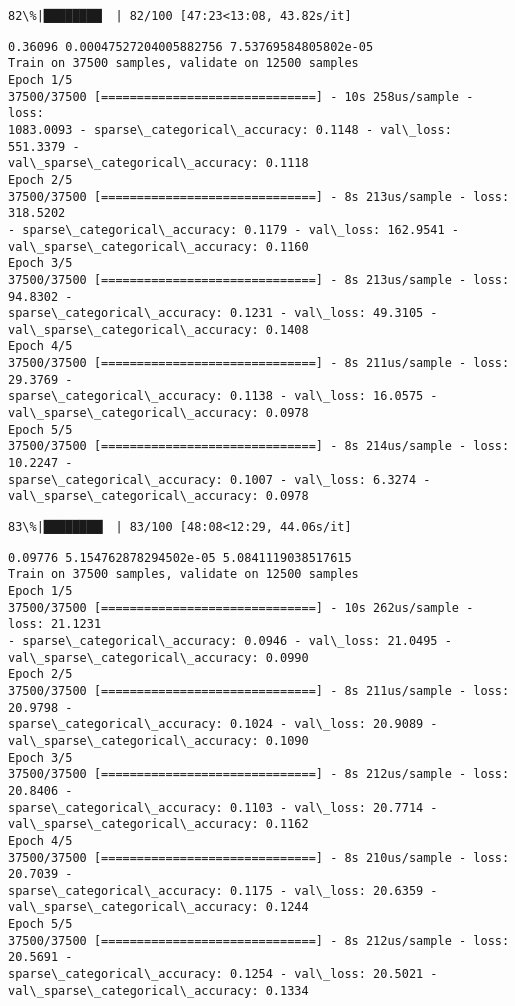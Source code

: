 \documentclass[11pt]{article}
\begin{document}
    \begin{Verbatim}[commandchars=\\\{\}]
 82\%|████████▏ | 82/100 [47:23<13:08, 43.82s/it]
    \end{Verbatim}

    \begin{Verbatim}[commandchars=\\\{\}]
0.36096 0.00047527204005882756 7.53769584805802e-05
Train on 37500 samples, validate on 12500 samples
Epoch 1/5
37500/37500 [==============================] - 10s 258us/sample - loss:
1083.0093 - sparse\_categorical\_accuracy: 0.1148 - val\_loss: 551.3379 -
val\_sparse\_categorical\_accuracy: 0.1118
Epoch 2/5
37500/37500 [==============================] - 8s 213us/sample - loss: 318.5202
- sparse\_categorical\_accuracy: 0.1179 - val\_loss: 162.9541 -
val\_sparse\_categorical\_accuracy: 0.1160
Epoch 3/5
37500/37500 [==============================] - 8s 213us/sample - loss: 94.8302 -
sparse\_categorical\_accuracy: 0.1231 - val\_loss: 49.3105 -
val\_sparse\_categorical\_accuracy: 0.1408
Epoch 4/5
37500/37500 [==============================] - 8s 211us/sample - loss: 29.3769 -
sparse\_categorical\_accuracy: 0.1138 - val\_loss: 16.0575 -
val\_sparse\_categorical\_accuracy: 0.0978
Epoch 5/5
37500/37500 [==============================] - 8s 214us/sample - loss: 10.2247 -
sparse\_categorical\_accuracy: 0.1007 - val\_loss: 6.3274 -
val\_sparse\_categorical\_accuracy: 0.0978
    \end{Verbatim}

    \begin{Verbatim}[commandchars=\\\{\}]
 83\%|████████▎ | 83/100 [48:08<12:29, 44.06s/it]
    \end{Verbatim}

    \begin{Verbatim}[commandchars=\\\{\}]
0.09776 5.154762878294502e-05 5.0841119038517615
Train on 37500 samples, validate on 12500 samples
Epoch 1/5
37500/37500 [==============================] - 10s 262us/sample - loss: 21.1231
- sparse\_categorical\_accuracy: 0.0946 - val\_loss: 21.0495 -
val\_sparse\_categorical\_accuracy: 0.0990
Epoch 2/5
37500/37500 [==============================] - 8s 211us/sample - loss: 20.9798 -
sparse\_categorical\_accuracy: 0.1024 - val\_loss: 20.9089 -
val\_sparse\_categorical\_accuracy: 0.1090
Epoch 3/5
37500/37500 [==============================] - 8s 212us/sample - loss: 20.8406 -
sparse\_categorical\_accuracy: 0.1103 - val\_loss: 20.7714 -
val\_sparse\_categorical\_accuracy: 0.1162
Epoch 4/5
37500/37500 [==============================] - 8s 210us/sample - loss: 20.7039 -
sparse\_categorical\_accuracy: 0.1175 - val\_loss: 20.6359 -
val\_sparse\_categorical\_accuracy: 0.1244
Epoch 5/5
37500/37500 [==============================] - 8s 212us/sample - loss: 20.5691 -
sparse\_categorical\_accuracy: 0.1254 - val\_loss: 20.5021 -
val\_sparse\_categorical\_accuracy: 0.1334
    \end{Verbatim}
\end{document}
